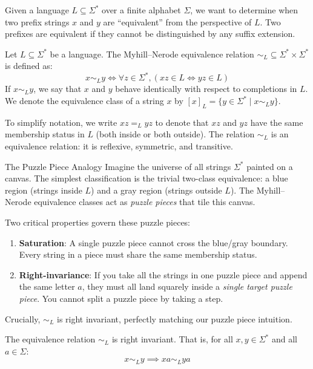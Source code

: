 Given a language $L \subseteq \Sigma^*$ over a finite alphabet $\Sigma$, we want to determine when two prefix strings $x$ and $y$ are ``equivalent'' from the perspective of $L$. Two prefixes are equivalent if they cannot be distinguished by any suffix extension.

\begin{definition}
\label{def:myhill-nerode-equiv}
Let $L \subseteq \Sigma^*$ be a language. The Myhill--Nerode equivalence relation $\sim_L \subseteq \Sigma^* \times \Sigma^*$ is defined as:
\[
  x \sim_L y \iff \forall z \in \Sigma^*, (xz \in L \iff yz \in L)
\]
If $x \sim_L y$, we say that $x$ and $y$ behave identically with respect to completions in $L$. We denote the equivalence class of a string $x$ by $[x]_L = \{y \in \Sigma^* \mid x \sim_L y\}$.
\end{definition}

To simplify notation, we write $xz =_L yz$ to denote that $xz$ and $yz$ have the same membership status in $L$ (both inside or both outside). The relation $\sim_L$ is an equivalence relation: it is reflexive, symmetric, and transitive. 

\begin{intermezzo}{The Puzzle Piece Analogy}
Imagine the universe of all strings $\Sigma^*$ painted on a canvas. The simplest classification is the trivial two-class equivalence: a blue region (strings inside $L$) and a gray region (strings outside $L$). The Myhill--Nerode equivalence classes act as \emph{puzzle pieces} that tile this canvas. 

Two critical properties govern these puzzle pieces:
\begin{enumerate}
    \item \textbf{Saturation}: A single puzzle piece cannot cross the blue/gray boundary. Every string in a piece must share the same membership status.
    \item \textbf{Right-invariance}: If you take all the strings in one puzzle piece and append the same letter $a$, they must all land squarely inside a \emph{single target puzzle piece}. You cannot split a puzzle piece by taking a step.
\end{enumerate}
\end{intermezzo}

Crucially, $\sim_L$ is right invariant, perfectly matching our puzzle piece intuition.

\begin{lemma}
\label{lem:right-invariance}
The equivalence relation $\sim_L$ is right invariant. That is, for all $x, y \in \Sigma^*$ and all $a \in \Sigma$:
\[
  x \sim_L y \implies xa \sim_L ya
\]
\end{lemma}

